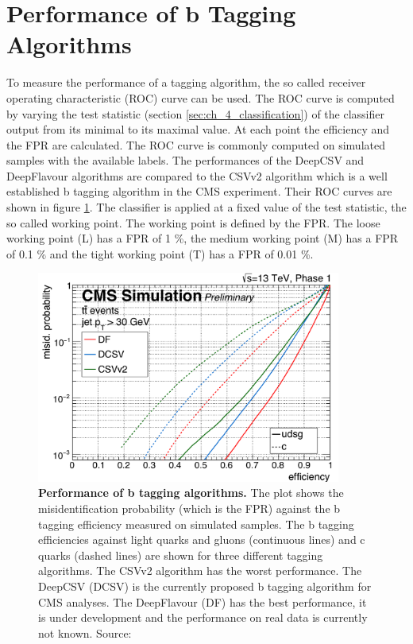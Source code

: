 \section{Performance of b Tagging Algorithms}
To measure the performance of a tagging algorithm, the so called receiver operating characteristic (ROC) curve can be used. The ROC curve is computed by varying the test statistic (section \ref{sec:ch_4_classification}) of the classifier output from its minimal to its maximal value. At each point the efficiency and the FPR are calculated. The ROC curve is commonly computed on simulated samples with the available labels. The performances of the DeepCSV and DeepFlavour algorithms are compared to the CSVv2 algorithm which is a well established b tagging algorithm in the CMS experiment. Their ROC curves are shown in figure \ref{fig:ch_5_Performance}. The classifier is applied at a fixed value of the test statistic, the so called working point. The working point is defined by the FPR. The loose working point (L) has a FPR of 1 \%, the medium working point (M) has a FPR of 0.1 \% and the tight working point (T) has a FPR of 0.01 \%. \\

\begin{figure}
\centering
\includegraphics[width=10cm]{chapter_5_tagging/performance.png}
\caption[Architecture of the DeepFlavour Algorithm]{\textbf{Performance of b tagging algorithms.} The plot shows the misidentification probability (which is the FPR) against the b tagging efficiency measured on simulated samples. The b tagging efficiencies against light quarks and gluons (continuous lines) and c quarks (dashed lines) are shown for three different tagging algorithms. The CSVv2 algorithm has the worst performance. The DeepCSV (DCSV) is the currently proposed b tagging algorithm for CMS analyses. The DeepFlavour (DF) has the best performance, it is under development and the performance on real data is currently not known. Source: \cite{DeepFlavour}}
\label{fig:ch_5_Performance}
\end{figure}

